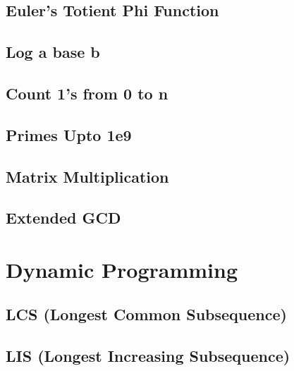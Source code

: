 \documentclass[10pt, a4paper]{article}
\begin{document}
\begin{multicols}{2}
\subsection{Euler's Totient Phi Function}


\subsection{Log a base b}


\subsection{Count 1's from 0 to n}


\subsection{Primes Upto 1e9}


\subsection{Matrix Multiplication}


\subsection{Extended GCD}



\section{Dynamic Programming}
\subsection{LCS (Longest \allowbreak Common Subsequence)}


\subsection{LIS (Longest \allowbreak Increasing Subsequence)}



\end{multicols}
\end{document}

